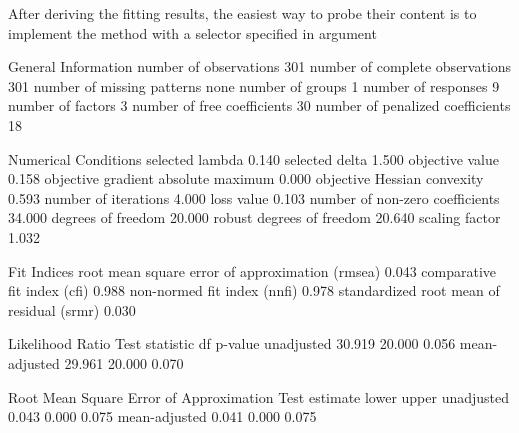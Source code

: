 \documentclass[nojss]{jss}
\begin{document}
After deriving the fitting results, the easiest way to probe their content is to implement the  method with a selector specified in argument 
\begin{Schunk}
\begin{Soutput}
General Information                                                            
   number of observations                                301
   number of complete observations                       301
   number of missing patterns                           none
   number of groups                                        1
   number of responses                                     9
   number of factors                                       3
   number of free coefficients                            30
   number of penalized coefficients                       18

Numerical Conditions                                                            
   selected lambda                                     0.140
   selected delta                                      1.500
   objective value                                     0.158
   objective gradient absolute maximum                 0.000
   objective Hessian convexity                         0.593
   number of iterations                                4.000
   loss value                                          0.103
   number of non-zero coefficients                    34.000
   degrees of freedom                                 20.000
   robust degrees of freedom                          20.640
   scaling factor                                      1.032

Fit Indices                                                            
   root mean square error of approximation (rmsea)     0.043
   comparative fit index (cfi)                         0.988
   non-normed fit index (nnfi)                         0.978
   standardized root mean of residual (srmr)           0.030

Likelihood Ratio Test
                    statistic         df    p-value
   unadjusted          30.919     20.000      0.056
   mean-adjusted       29.961     20.000      0.070

Root Mean Square Error of Approximation Test
                     estimate      lower      upper
   unadjusted           0.043      0.000      0.075
   mean-adjusted        0.041      0.000      0.075


\end{Soutput}
\end{Schunk}
\end{document}
